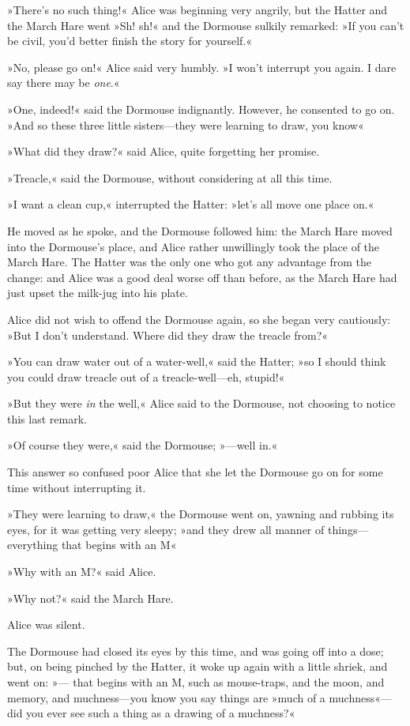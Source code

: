 »There's no such thing!« Alice was beginning very angrily, but the Hatter and the March Hare went »Sh! sh!« and the Dormouse sulkily remarked: »If you can't be civil, you'd better finish the story for yourself.«

»No, please go on!« Alice said very humbly. »I won't interrupt you again. I dare say there may be \textit{one}.«

»One, indeed!« said the Dormouse indignantly. However, he consented to go on. »And so these three little sisters—they were learning to draw, you know\longdash«

»What did they draw?« said Alice, quite forgetting her promise.

»Treacle,« said the Dormouse, without considering at all this time.

»I want a clean cup,« interrupted the Hatter: »let's all move one place on.«

He moved as he spoke, and the Dormouse followed him: the March Hare moved into the Dormouse's place, and Alice rather unwillingly took the place of the March Hare. The Hatter was the only one who got any advantage from the change: and Alice was a good deal worse off than before, as the March Hare had just upset the milk-jug into his plate.

Alice did not wish to offend the Dormouse again, so she began very cautiously: »But I don't understand. Where did they draw the treacle from?«

»You can draw water out of a water-well,« said the Hatter; »so I should think you could draw treacle out of a treacle-well—eh, stupid!«

»But they were \textit{in} the well,« Alice said to the Dormouse, not choosing to notice this last remark.

»Of course they were,« said the Dormouse; »—well in.«

This answer so confused poor Alice that she let the Dormouse go on for some time without interrupting it.

»They were learning to draw,« the Dormouse went on, yawning and rubbing its eyes, for it was getting very sleepy; »and they drew all manner of things—everything that begins with an M\longdash«

»Why with an M\@?« said Alice.

»Why not?« said the March Hare.

Alice was silent.

The Dormouse had closed its eyes by this time, and was going off into a dose; but, on being pinched by the Hatter, it woke up again with a little shriek, and went on: »— that begins with an M, such as mouse-traps, and the moon, and memory, and muchness—you know you say things are »much of a muchness«—did you ever see such a thing as a drawing of a muchness?«


